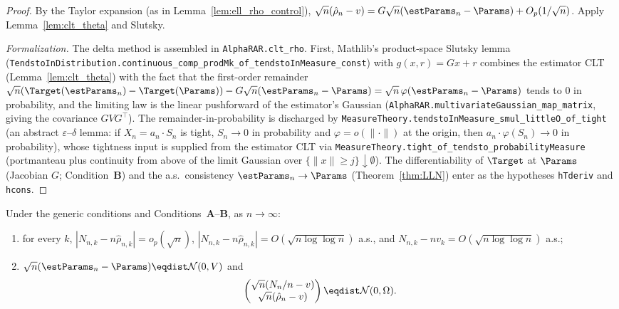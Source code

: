 \begin{proof}\leanok
{}
By the Taylor expansion (as in Lemma~\ref{lem:ell_rho_control}),
$\sqrt n(\hat{\rho}_n-v)=G\sqrt n(\estParams_n-\Params)+O_p(1/\sqrt n)$. Apply
Lemma~\ref{lem:clt_theta} and Slutsky.

\emph{Formalization.} The delta method is assembled in
\texttt{AlphaRAR.clt\_rho}. First, Mathlib's product-space Slutsky lemma
(\texttt{TendstoInDistribution.continuous\_comp\_prodMk\_of\_tendstoInMeasure\_const}) with
$g(x,r)=Gx+r$ combines the estimator
CLT (Lemma~\ref{lem:clt_theta}) with the fact that the first-order remainder
$\sqrt n(\Target(\estParams_n)-\Target(\Params))-G\sqrt n(\estParams_n-\Params)=\sqrt n\,\varphi(\estParams_n-\Params)$
tends to $0$ in probability, and the limiting law is the linear pushforward of the estimator's Gaussian
(\texttt{AlphaRAR.multivariateGaussian\_map\_matrix}, giving the covariance $GVG^\top$). The
remainder-in-probability is discharged by \texttt{MeasureTheory.tendstoInMeasure\_smul\_littleO\_of\_tight}
(an abstract $\varepsilon$--$\delta$ lemma: if $X_n=a_n\cdot S_n$ is tight, $S_n\to0$ in probability and
$\varphi=o(\|\cdot\|)$ at the origin, then $a_n\cdot\varphi(S_n)\to0$ in probability), whose tightness
input is supplied from the estimator CLT via
\texttt{MeasureTheory.tight\_of\_tendsto\_probabilityMeasure} (portmanteau plus continuity from above of
the limit Gaussian over $\{\|x\|\ge j\}\downarrow\emptyset$). The differentiability of $\Target$ at
$\Params$ (Jacobian $G$; Condition~\textbf{B}) and the a.s.\ consistency $\estParams_n\to\Params$
(Theorem~\ref{thm:LLN}) enter as the hypotheses \texttt{hTderiv} and \texttt{hcons}.
\end{proof}

\begin{theorem}\label{thm:normality}
Under the generic conditions and Conditions~\textbf{A}--\textbf{B}, as
$n\to\infty$:
\begin{enumerate}
  \item[(i)] for every $k$, $|N_{n,k}-n\hat{\rho}_{n,k}|=o_p(\sqrt n)$,
        $|N_{n,k}-n\hat{\rho}_{n,k}|=O(\sqrt{n\log\log n})$ a.s., and
        $N_{n,k}-nv_k=O(\sqrt{n\log\log n})$ a.s.;
  \item[(ii)] $\sqrt n(\estParams_n-\Params)\eqdist\mathcal{N}(0,V)$ and
        \[
          \begin{pmatrix}\sqrt n(N_n/n - v)\\ \sqrt n(\hat{\rho}_n - v)\end{pmatrix}
          \eqdist \mathcal{N}(0,\Omega).
        \]
\end{enumerate}
\end{theorem}

